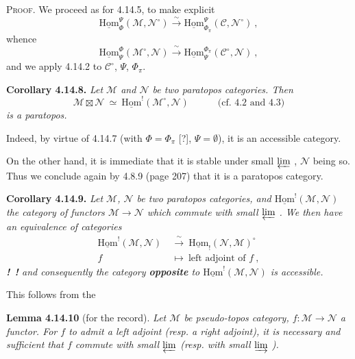 \documentclass[11pt]{article}
\newcommand{\msp}[1]{\marginpar{\footnotesize [#1]}}
\newcommand{\uHom}{\underline{\mathrm{Hom}}}
\begin{document}
\noindent\textsc{Proof}. We proceed as for 4.14.5, to make explicit
\[
\uHom^{\Psi}_{\Phi}(\mathcal{M},\mathcal{N}^{\circ}) \xrightarrow{\ \sim\ } \uHom^{\Psi}_{\Phi_\pi}(\mathcal{C},\mathcal{N}^{\circ})\ ,
\]
whence
\[
\uHom^{\Phi}_{\Psi}(\mathcal{M}^{\circ},\mathcal{N}) \xrightarrow{\ \sim\ } \uHom^{\Phi_\pi}_{\Psi}(\mathcal{C}^{\circ},\mathcal{N})\ ,
\]
and we apply 4.14.2 to $\mathcal{C}^{\circ}$, $\Psi$, $\Phi_\pi$.

\noindent\textbf{Corollary 4.14.8.} {\itshape Let $\mathcal{M}$ and $\mathcal{N}$ be two paratopos categories. Then
\[
\mathcal{M}\boxtimes\mathcal{N}\ \simeq\ \uHom^{!}(\mathcal{M}^{\circ},\mathcal{N}) \qquad\quad \text{(cf. 4.2 and 4.3)}
\]
is a paratopos.}

Indeed, by virtue of 4.14.7 (with $\Phi=\Phi_\pi$ [?], $\Psi=\emptyset$), it is an accessible category.

\msp{page 379}

On the other hand, it is immediate that it is stable under small $\varprojlim$ , $\mathcal{N}$ being so. Thus we conclude again by 4.8.9 (page 207) that it is a paratopos category.

\noindent\textbf{Corollary 4.14.9.} {\itshape Let $\mathcal{M}$, $\mathcal{N}$ be two paratopos categories, and $\uHom^{!}(\mathcal{M},\mathcal{N})$ the category of functors $\mathcal{M}\longrightarrow\mathcal{N}$ which commute with small $\varprojlim$ . We then have an equivalence of categories
\[
\begin{aligned}
\uHom^{!}(\mathcal{M},\mathcal{N}) &\ \xrightarrow{\ \sim\ }\ \uHom_{!}(\mathcal{N},\mathcal{M})^{\circ}\\
f &\ \longmapsto\ \text{left adjoint of } f\ ,
\end{aligned}
\]
\noindent\textup{\textbf{!}}\ \textup{\textbf{!}} and consequently the category \textup{\textbf{opposite}} to $\uHom^{!}(\mathcal{M},\mathcal{N})$ is accessible.} %

This follows from the

\noindent\textbf{Lemma 4.14.10} (for the record). {\itshape Let $\mathcal{M}$ be pseudo-topos category, $f:\mathcal{M}\longrightarrow\mathcal{N}$ a functor. For $f$ to admit a left adjoint (resp. a right adjoint), it is necessary and sufficient that $f$ commute with small $\varprojlim$ (resp. with small $\varinjlim$ ).}
\end{document}
